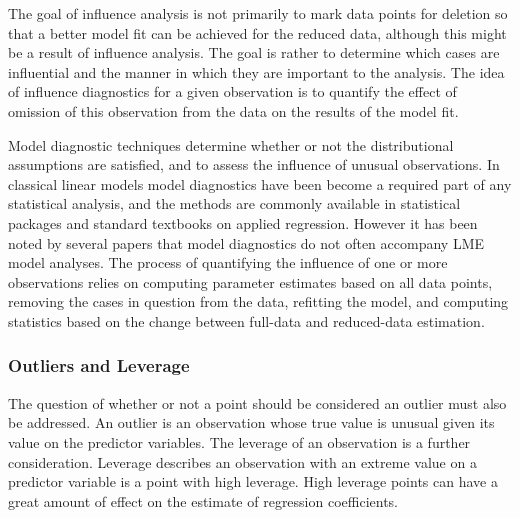 \documentclass[12pt, a4paper]{report}
\theoremstyle{plain}
\theoremstyle{definition}
\theoremstyle{remark}
\begin{document}
		
	The goal of influence analysis is not primarily to mark data
	points for deletion so that a better model fit can be achieved for the reduced data, although this might be a
	result of influence analysis. The goal is rather to determine which cases are influential and the manner in
	which they are important to the analysis. The idea of influence diagnostics for a given observation is to quantify the effect of omission of this observation
	from the data on the results of the model fit. %
	
	Model diagnostic techniques determine whether or not the distributional assumptions are satisfied, and to assess the influence of unusual observations. In classical linear models model diagnostics have been become a required part of any statistical analysis, and the methods are commonly available in statistical packages and standard textbooks on applied regression. However it has been noted by several papers that model diagnostics do not often accompany LME model analyses.
	The process of quantifying the influence of one or more observations relies on computing parameter estimates based on all data points, removing the cases in question from the data, refitting the model, and computing statistics based on the change between full-data and reduced-data estimation.
	
	
	
	
	
	

	\subsubsection{Outliers and Leverage}
	
	
	
	The question of whether or not a point should be considered an outlier must also be addressed. An outlier is an observation whose true value is unusual given its value on the predictor variables. The leverage of an observation is a further consideration. Leverage describes an observation with an extreme value on a predictor variable is a point with high leverage. High leverage points can have a great amount of effect on the estimate of regression coefficients.
	
\end{document}
